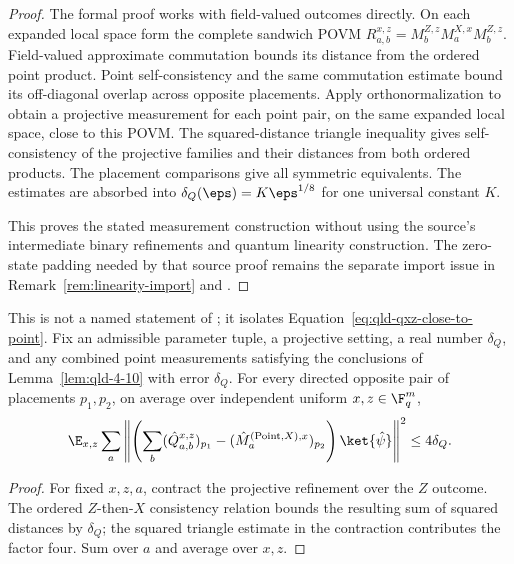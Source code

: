 \begin{proof}
	\leanok
	The formal proof works with field-valued outcomes directly. On each
	expanded local space form the complete sandwich POVM
	$R^{x,z}_{a,b}=M^{Z,z}_b M^{X,x}_a M^{Z,z}_b$.
	Field-valued approximate commutation bounds its distance from the ordered
	point product. Point self-consistency and the same commutation estimate
	bound its off-diagonal overlap across opposite placements.
	Apply orthonormalization to obtain a projective measurement for each
	point pair, on the same expanded local space, close to this POVM.
	The squared-distance triangle inequality gives self-consistency of the
	projective families and their distances from both ordered products.
	The placement comparisons give all symmetric equivalents.
	The estimates are absorbed into $\delta_Q(\eps)=K\eps^{1/8}$ for one
	universal constant $K$.

	This proves the stated measurement construction without using the source's
	intermediate binary refinements and quantum linearity construction.
	The zero-state padding needed by that source proof remains the separate
	import issue in Remark~\ref{rem:linearity-import} and
	\cite{gap:qpbt_linearity-theorem-quotation}.
\end{proof}

\begin{lemma}
	\label{lem:qld-combined-point-x-marginal-distance}
	\leanok
	This is not a named statement of \cite{Ji2020MIPStar}; it isolates
	Equation~\eqref{eq:qld-qxz-close-to-point}. Fix an admissible parameter
	tuple, a projective setting, a real number $\delta_Q$, and any combined point
	measurements satisfying the conclusions of Lemma~\ref{lem:qld-4-10} with
	error $\delta_Q$. For every directed opposite pair of placements $p_1,p_2$,
	on average over independent uniform $x,z\in\F_q^m$,
	\[
		\E_{x,z}\sum_a \left\|
		\left(\sum_b (\hat Q^{x,z}_{a,b})_{p_1}
			- (\hat M^{(\mathrm{Point},X),x}_a)_{p_2}\right)
		\ket{\hat\psi}\right\|^2 \leq 4\delta_Q.
		\label{eq:qld-qxz-close-to-point}
	\]
\end{lemma}
\begin{proof}
	\leanok
	For fixed $x,z,a$, contract the projective refinement over the $Z$ outcome.
	The ordered $Z$-then-$X$ consistency relation bounds the resulting sum of
	squared distances by $\delta_Q$; the squared triangle estimate in the
	contraction contributes the factor four. Sum over $a$ and average over
	$x,z$.
\end{proof}

